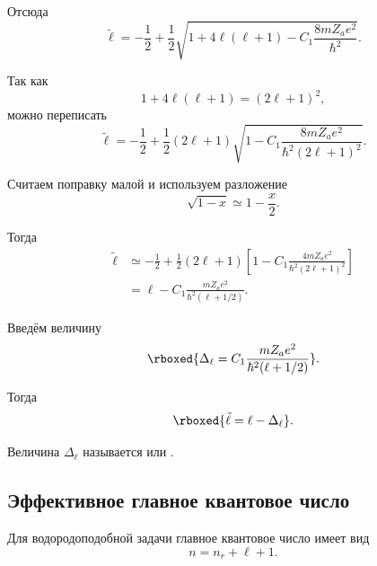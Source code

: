 \documentclass[../final.tex]{subfiles}
\begin{document}
Отсюда
\begin{equation*}
    \tilde\ell
    =
    -\frac12
    +
    \frac12
    \sqrt{
        1+4\ell(\ell+1)
        -
        C_1\frac{8mZ_a e^2}{\hbar^2}
    }.
\end{equation*}

Так как
\begin{equation*}
    1+4\ell(\ell+1)
    =
    (2\ell+1)^2,
\end{equation*}
можно переписать
\begin{equation*}
    \tilde\ell
    =
    -\frac12
    +
    \frac12(2\ell+1)
    \sqrt{
        1
        -
        C_1
        \frac{8mZ_a e^2}
        {\hbar^2(2\ell+1)^2}
    }.
\end{equation*}

Считаем поправку малой и используем разложение
\begin{equation*}
    \sqrt{1-x}
    \simeq
    1-\frac{x}{2}.
\end{equation*}

Тогда
\begin{align*}
    \tilde\ell
    &\simeq
    -\frac12
    +
    \frac12(2\ell+1)
    \left[
        1
        -
        C_1
        \frac{4mZ_a e^2}
        {\hbar^2(2\ell+1)^2}
    \right]
    \\
    &=
    \ell
    -
    C_1
    \frac{mZ_a e^2}
    {\hbar^2(\ell+1/2)}.
\end{align*}

Введём величину
\begin{equation*}
    \rboxed{
        \Delta_\ell
        =
        C_1
        \frac{mZ_a e^2}
        {\hbar^2(\ell+1/2)}
    }.
\end{equation*}

Тогда
\begin{equation*}
    \rboxed{
        \tilde\ell
        =
        \ell-\Delta_\ell
    }.
\end{equation*}

Величина \(\Delta_\ell\) называется 
или .

\subsection{Эффективное главное квантовое число}

Для водородоподобной задачи главное квантовое число имеет вид
\begin{equation*}
    n=n_r+\ell+1.
\end{equation*}
\end{document}
